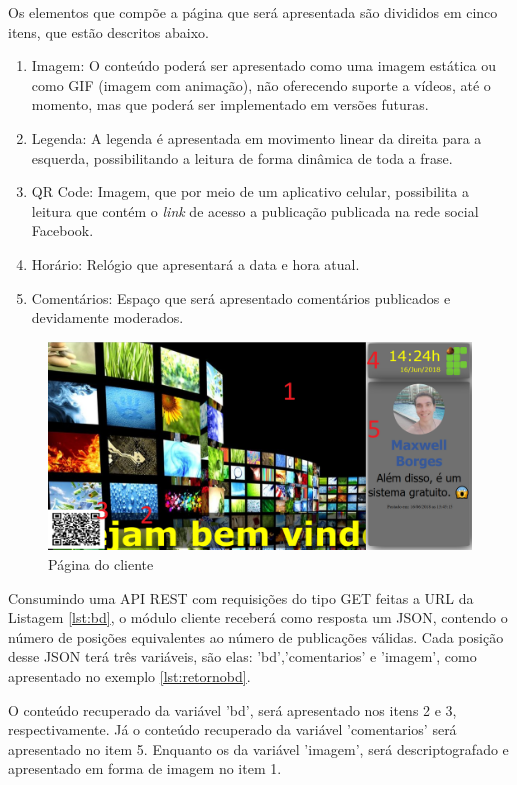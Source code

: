 Os elementos que compõe a página que será apresentada são divididos em cinco itens, que estão descritos abaixo.

\begin{enumerate}
   \item Imagem: O conteúdo poderá ser apresentado como uma imagem estática ou como GIF (imagem com animação), não oferecendo suporte a vídeos, até o momento, mas que poderá ser implementado em versões futuras. 
   \item Legenda: A legenda é apresentada em movimento linear da direita para a esquerda, possibilitando a leitura de forma dinâmica de toda a frase.
   \item QR Code: Imagem, que por meio de um aplicativo celular, possibilita a leitura que contém o \textit{link} de acesso a publicação publicada na rede social Facebook.
   \item Horário: Relógio que apresentará a data e hora atual.  
   \item Comentários: Espaço que será apresentado comentários publicados e devidamente moderados.
 \end{enumerate}
  
\begin{figure}[H]
\centering
\includegraphics[scale=0.3]{figuras/cliente1}
\caption{Página do cliente}
\label{fig:cliente1}
\end{figure}

Consumindo uma API REST com requisições do tipo GET feitas a URL da Listagem \ref{lst:bd}, o módulo cliente receberá como resposta um JSON, contendo o número de posições equivalentes ao número de publicações válidas. Cada posição desse JSON terá três variáveis, são elas: 'bd','comentarios' e 'imagem', como apresentado no exemplo \ref{lst:retornobd}. 

O conteúdo recuperado da variável 'bd', será apresentado nos itens 2 e 3, respectivamente. Já o conteúdo recuperado da variável 'comentarios' será apresentado no item 5. Enquanto os da variável 'imagem', será descriptografado e apresentado em forma de imagem no item 1.

